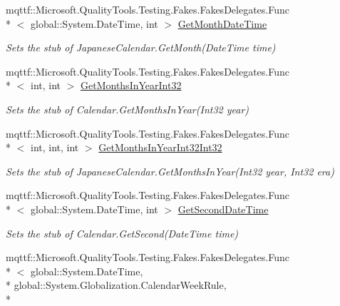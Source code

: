 \begin{DoxyCompactItemize}
mqttf\-::\-Microsoft.\-Quality\-Tools.\-Testing.\-Fakes.\-Fakes\-Delegates.\-Func\\*
$<$ global\-::\-System.\-Date\-Time, int $>$ \hyperlink{class_system_1_1_globalization_1_1_fakes_1_1_stub_japanese_calendar_a6df69fe98c7fa31237ab475f6b8d74b8}{Get\-Month\-Date\-Time}
\begin{DoxyCompactList}\small\item\em Sets the stub of Japanese\-Calendar.\-Get\-Month(\-Date\-Time time)\end{DoxyCompactList}\item 
mqttf\-::\-Microsoft.\-Quality\-Tools.\-Testing.\-Fakes.\-Fakes\-Delegates.\-Func\\*
$<$ int, int $>$ \hyperlink{class_system_1_1_globalization_1_1_fakes_1_1_stub_japanese_calendar_aeda163c4724ac21e7b1f2f9bf606b582}{Get\-Months\-In\-Year\-Int32}
\begin{DoxyCompactList}\small\item\em Sets the stub of Calendar.\-Get\-Months\-In\-Year(\-Int32 year)\end{DoxyCompactList}\item 
mqttf\-::\-Microsoft.\-Quality\-Tools.\-Testing.\-Fakes.\-Fakes\-Delegates.\-Func\\*
$<$ int, int, int $>$ \hyperlink{class_system_1_1_globalization_1_1_fakes_1_1_stub_japanese_calendar_ad38dac0320f4cca61a08cc2a2ccbb4b7}{Get\-Months\-In\-Year\-Int32\-Int32}
\begin{DoxyCompactList}\small\item\em Sets the stub of Japanese\-Calendar.\-Get\-Months\-In\-Year(\-Int32 year, Int32 era)\end{DoxyCompactList}\item 
mqttf\-::\-Microsoft.\-Quality\-Tools.\-Testing.\-Fakes.\-Fakes\-Delegates.\-Func\\*
$<$ global\-::\-System.\-Date\-Time, int $>$ \hyperlink{class_system_1_1_globalization_1_1_fakes_1_1_stub_japanese_calendar_a66ee129dca178962020b3974aeaad779}{Get\-Second\-Date\-Time}
\begin{DoxyCompactList}\small\item\em Sets the stub of Calendar.\-Get\-Second(\-Date\-Time time)\end{DoxyCompactList}\item 
mqttf\-::\-Microsoft.\-Quality\-Tools.\-Testing.\-Fakes.\-Fakes\-Delegates.\-Func\\*
$<$ global\-::\-System.\-Date\-Time, \\*
global\-::\-System.\-Globalization.\-Calendar\-Week\-Rule, \\*

\end{DoxyCompactItemize}
